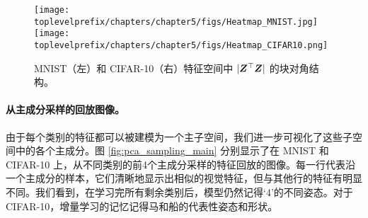 \documentclass[../../book-main.tex]{subfiles}
\begin{document}
\begin{figure}[tb]
\centering
\texttt{[image: \\toplevelprefix/chapters/chapter5/figs/Heatmap\_MNIST.jpg]}  \texttt{[image: \\toplevelprefix/chapters/chapter5/figs/Heatmap\_CIFAR10.png]}
\caption{\small MNIST（左）和 CIFAR-10（右）特征空间中 $|\bm{Z}^\top \bm{Z}|$ 的块对角结构。}
\label{fig:cifar_10_pca_sampling_main}
\end{figure}



\paragraph{从主成分采样的回放图像。}
由于每个类别的特征都可以被建模为一个主子空间，我们进一步可视化了这些子空间中的各个主成分。图 \ref{fig:pca_sampling_main} 分别显示了在 MNIST 和 CIFAR-10 上，从不同类别的前4个主成分采样的特征回放的图像。每一行代表沿一个主成分的样本，它们清晰地显示出相似的视觉特征，但与其他行的特征有明显不同。我们看到，在学习完所有剩余类别后，模型仍然记得‘4’的不同姿态。对于 CIFAR-10，增量学习的记忆记得马和船的代表性姿态和形状。
\end{document}
